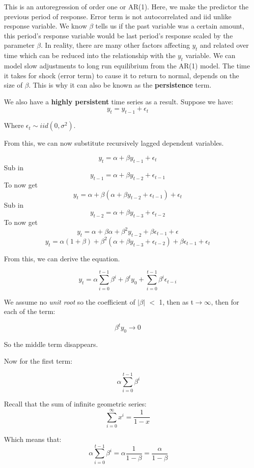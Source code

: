 \documentclass[11pt, oneside]{article}
\theoremstyle{definition}
\begin{document}
This is an autoregression of order one or AR(1). Here, we make the predictor the previous period of response. Error term is not autocorrelated and iid unlike response variable. We know $\beta$ tells us if the past variable was a certain amount, this period's response variable would be last period's response scaled by the parameter $\beta$. In reality, there are many other factors affecting $y_t$ and related over time which can be reduced into the relationship with the $y_t$ variable. We can model slow adjustments to long run equilibrium from the AR(1) model. The time it takes for shock (error term) to cause it to return to normal, depends on the size of $\beta$. This is why it can also be known as the \textbf{persistence} term.

We also have a \textbf{highly persistent} time series as a result. Suppose we have:
$$
y_t = y_{t-1} + \epsilon_t
$$

Where $\epsilon_t \sim iid(0,\sigma^2)$.


From this, we can now substitute recursively lagged dependent variables.

$$
y_t = \alpha + \beta y_{t-1} + \epsilon_t
$$
Sub in
$$
y_{t-1} = \alpha + \beta y_{t-2} + \epsilon_{t-1}
$$
To now get
$$
y_t = \alpha + \beta(\alpha + \beta y_{t-2} + \epsilon_{t-1}) + \epsilon_t
$$
Sub in
$$
y_{t-2} = \alpha + \beta y_{t-3} + \epsilon_{t-2}
$$
To now get
$$
y_t = \alpha + \beta\alpha + \beta^2 y_{t-2} + \beta \epsilon_{t-1} + \epsilon
$$
$$
y_t = \alpha(1 + \beta) + \beta^2 (\alpha + \beta y_{t-3} + \epsilon_{t-2}) + \beta \epsilon_{t-1} + \epsilon_t
$$

From this, we can derive the equation.

$$
y_t = \alpha \sum\limits_{i=0}^{t-1}\beta^i + \beta^t y_0 + \sum\limits_{i=0}^{t-1}\beta^i \epsilon_{t-i}
$$

We assume no \textit{unit root} so the coefficient of $|\beta|$ $<$ 1, then as t$\rightarrow \infty$, then for each of the term:

$$
\beta^t y_0 \rightarrow 0
$$

So the middle term disappears.

Now for the first term:

$$\
\alpha \sum\limits_{i=0}^{t-1}\beta^i
$$

Recall that the sum of infinite geometric series:
$$
\sum\limits_{i=0}^{\infty}x^i = \frac{1}{1-x}
$$

Which means that:
$$\
\alpha \sum\limits_{i=0}^{t-1}\beta^i = \alpha \frac{1}{1-\beta} = \frac{\alpha}{1-\beta}
$$
\end{document}
